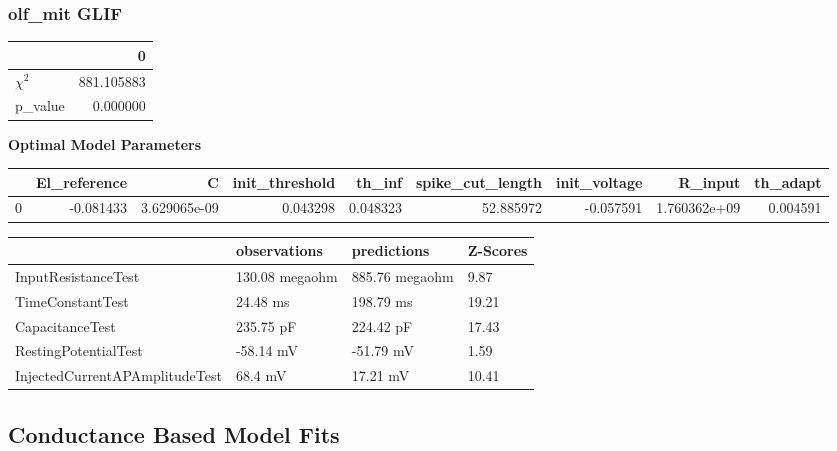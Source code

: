 \subsubsection{olf_mit GLIF}\begin{tabular}{lr}
\toprule
{} &           0 \\
\midrule
$\chi^{2}$ &  881.105883 \\
p\_value    &    0.000000 \\
\bottomrule
\end{tabular}
\textbf{Optimal Model Parameters} \begin{tabular}{lrrrrrrrr}
\toprule
{} &  El\_reference &             C &  init\_threshold &    th\_inf &  spike\_cut\_length &  init\_voltage &       R\_input &  th\_adapt \\
\midrule
0 &     -0.081433 &  3.629065e-09 &        0.043298 &  0.048323 &         52.885972 &     -0.057591 &  1.760362e+09 &  0.004591 \\
\bottomrule
\end{tabular}
\begin{tabular}{llll}
\toprule
{} &    observations &     predictions & Z-Scores \\
\midrule
InputResistanceTest            &  130.08 megaohm &  885.76 megaohm &     9.87 \\
TimeConstantTest               &        24.48 ms &       198.79 ms &    19.21 \\
CapacitanceTest                &       235.75 pF &       224.42 pF &    17.43 \\
RestingPotentialTest           &       -58.14 mV &       -51.79 mV &     1.59 \\
InjectedCurrentAPAmplitudeTest &         68.4 mV &        17.21 mV &    10.41 \\
\bottomrule
\end{tabular}



\subsection{Conductance Based Model Fits}

